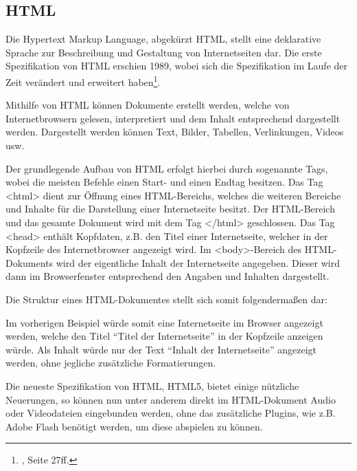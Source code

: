 \subsection{HTML}
\label{sec:Html}

Die Hypertext Markup Language, abgekürzt HTML, stellt eine deklarative Sprache zur Beschreibung und Gestaltung von Internetseiten dar. Die erste Spezifikation von HTML erschien 1989, wobei sich die Spezifikation im Laufe der Zeit verändert und erweitert haben\footnote{\citet{taglinger2003}, Seite 27ff.}.

Mithilfe von HTML können Dokumente erstellt werden, welche von Internetbrowsern gelesen, interpretiert und dem Inhalt entsprechend dargestellt werden. Dargestellt werden können Text, Bilder, Tabellen, Verlinkungen, Videos usw.

Der grundlegende Aufbau von HTML erfolgt hierbei durch sogenannte Tags, wobei die meisten Befehle einen Start- und einen Endtag besitzen.
Das Tag <html> dient zur Öffnung eines HTML-Bereichs, welches die weiteren Bereiche und Inhalte für die Darstellung einer Internetseite besitzt. Der HTML-Bereich und das gesamte Dokument wird mit dem Tag </html> geschlossen. Das Tag <head> enthält Kopfdaten, z.B. den Titel einer Internetseite, welcher in der Kopfzeile des Internetbrowser angezeigt wird. Im <body>-Bereich des HTML-Dokuments wird der eigentliche Inhalt der Internetseite angegeben. Dieser wird dann im Browserfenster entsprechend den Angaben und Inhalten dargestellt.

Die Struktur eines HTML-Dokumentes stellt sich somit folgendermaßen dar:



Im vorherigen Beispiel würde somit eine Internetseite im Browser angezeigt werden, welche den Titel "`Titel der Internetseite"' in der Kopfzeile anzeigen würde. Als Inhalt würde nur der Text "`Inhalt der Internetseite"' angezeigt werden, ohne jegliche zusätzliche Formatierungen.

Die neueste Spezifikation von HTML, HTML5, bietet einige nützliche Neuerungen, so können nun unter anderem direkt im HTML-Dokument Audio oder Videodateien eingebunden werden, ohne das zusätzliche Plugins, wie z.B. Adobe Flash benötigt werden, um diese abspielen zu können.